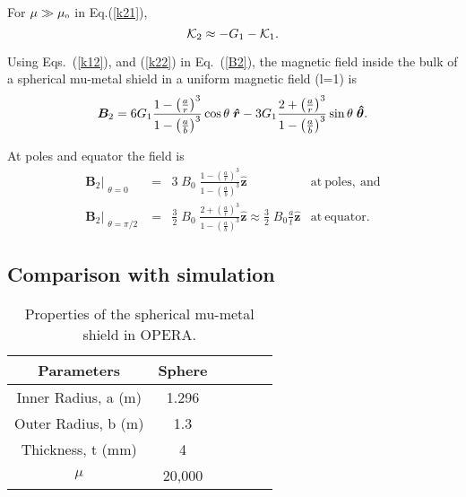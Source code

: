 For \(\mu\gg\mu_{\scriptscriptstyle 0}\) in Eq.(\ref{k21}),
\begin{equation}\label{k22}
\mathcal{K}_2\approx-G_1-\mathcal{K}_1{\rm .}
\end{equation}

Using Eqs.~(\ref{k12}), and (\ref{k22}) in Eq.~(\ref{B2}), the magnetic field inside the bulk of a spherical mu-metal shield in a uniform magnetic field (l=1) is
\begin{equation}
    \bm{B}_2=6 G_1\frac{1-\left(\frac{a}{r}\right)^3}{1-\left(\frac{a}{b}\right)^3}\cos\theta\;\bm{\hat{r}}-3 G_1\frac{2+\left(\frac{a}{r}\right)^3}{1-\left(\frac{a}{b}\right)^3}\sin\theta\;\bm{\hat{\theta}}{\rm .}
\end{equation}

At poles and equator the field is
\begin{align}
    &\bm{B}_2\Bigr|_{\substack{\theta=0}} &=& 3\;B_0\;\frac{1-\left(\frac{a}{r}\right)^3}{1-\left(\frac{a}{b}\right)^3}\bm{\hat{z}}&\mathrm{at~poles,~and}&\\
    &\bm{B}_2\Bigr|_{\substack{\theta=\pi/2}} &=& \frac{3}{2}\;B_0\;\frac{2+\left(\frac{a}{r}\right)^3}{1-\left(\frac{a}{b}\right)^3}\bm{\hat{z}}\approx \frac{3}{2}\;B_0\frac{a}{t}\bm{\hat{z}}&\mathrm{at~equator.}&
\end{align}

\subsection{Comparison with simulation}
\begin{table} [!tb]
    \centering
    \begin{tabular} { |c|c|c|c|c|c|} 
        \hline
        Parameters & Sphere \\
        \hline\hline
        Inner Radius, a (m) & 1.296\\ 
        \hline
        Outer Radius, b (m) & 1.3 \\ 
        \hline
        Thickness, t (mm) & 4 \\ 
        \hline
        $\mu$  & 20,000 \\ 
        \hline
    \end{tabular}
    \caption{Properties of the spherical mu-metal shield in OPERA.}\label{table:opera_sphere}
\end{table}

